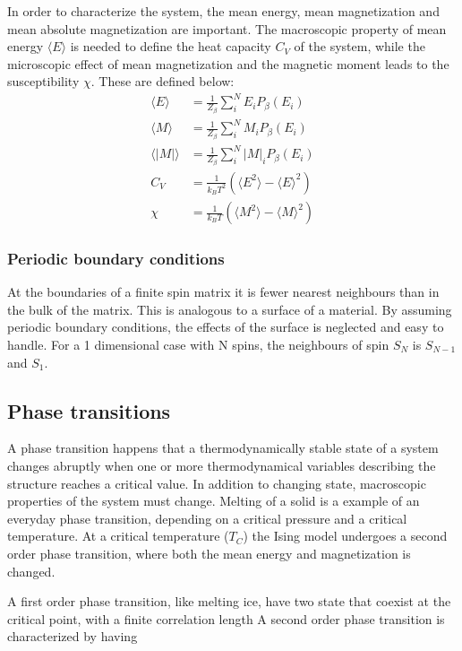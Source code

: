 In order to characterize the system, the mean energy, mean magnetization and mean absolute magnetization are important. The macroscopic property of mean energy $ \langle E \rangle $ is needed to define the heat capacity $ C_V$ of the system, while the microscopic effect of mean magnetization and the magnetic moment leads to the susceptibility $ \chi $. These are defined below: 
\begin{align}
\langle E \rangle &= \frac{1}{Z_{\beta}} \sum\limits_{i}^N E_i P_{\beta}(E_i)\\
\langle M \rangle &= \frac{1}{Z_{\beta}} \sum\limits_{i}^N M_i P_{\beta}(E_i)\\
\langle |M | \rangle &= \frac{1}{Z_{\beta}} \sum\limits_{i}^N |M|_i P_{\beta}(E_i)\\
 C_V &= \frac{1}{k_B T^2} \left( 	\langle E^2 \rangle - \langle E\rangle^2 	\right)\\
\chi &= \frac{1}{k_B T} \left( 	\langle M^2 \rangle - \langle M\rangle^2 	\right)
\end{align}


\subsubsection{Periodic boundary conditions}

At the boundaries of a finite spin matrix it is fewer nearest neighbours than in the bulk of the matrix. This is analogous to a surface of a material. By assuming periodic boundary conditions, the effects of the surface is neglected and easy to handle. For a 1 dimensional case with N spins, the neighbours of spin $ S_N $ is $ S_{N-1} $ and $ S_1 $. 

\subsection{Phase transitions}

A phase transition happens that a thermodynamically stable state of a system changes abruptly  when one or more thermodynamical  variables describing the structure reaches a critical value. In addition to changing state, macroscopic properties of the system must change. Melting of a solid is a example of an everyday phase transition, depending on a critical pressure and a critical temperature. At a critical temperature ($ T_C $) the Ising model undergoes a second order phase transition, where both the mean energy and magnetization is changed. 


A first order phase transition, like melting ice, have two state that coexist at the critical point, with a finite  correlation length
A second order phase transition is characterized by having 


